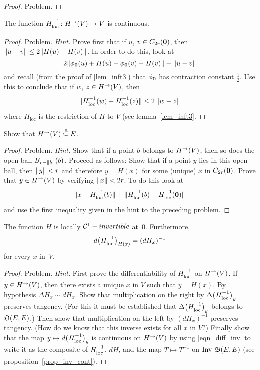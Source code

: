 \begin{proof} Problem.  \ns  \end{proof}

\begin{lem}\label{lem_inft5} The function $H_{\mathstrut\text{loc}}^{\mathstrut{-1}} \colon H^{\rightarrow}(V) \rightarrow V$ is continuous.
\end{lem}

\begin{proof} Problem.  \emph{Hint.}  Prove first that if $u$, $v \in C_{2r}(\mathbf{0})$, then
$\lVert u - v\rVert \le 2\lVert H(u) - H(v)\rVert$.  In order to do this, look at
  \[ 2\lVert\phi_{\mathbf{0}}(u) + H(u) - \phi_{\mathbf{0}}(v) - H(v)\rVert - \lVert u - v\rVert \]
and recall (from the proof of \ref{lem_inft3}) that $\phi_{\mathbf{0}}$ has contraction constant
$\frac12$.  Use this to conclude that if $w$, $z \in H^{\rightarrow}(V)$,  then
  \[ \lVert H_{\mathstrut\text{loc}}^{\mathstrut{-1}}(w) - H_{\mathstrut\text{loc}}^{\mathstrut{-1}}(z)\rVert \le 2\,\lVert w - z\rVert \]
where $H_{\text{loc}}$ is the restriction of $H$ to $V$ (see lemma~\ref{lem_inft3}.  \ns
\end{proof}

\begin{lem}\label{lem_inft6} Show that $H^{\rightarrow}(V)\overset{\thickspace{}_\circ}{\subseteq}E$.
\end{lem}

\begin{proof} Problem.  \emph{Hint.}  Show that if a point $b$ belongs to $H^{\rightarrow}(V)$, then
so does the open ball $B_{r - \lVert b\rVert}(b)$.  Proceed as follows: Show that if a point $y$ lies
in this open ball, then $\lVert y\rVert < r$ and therefore $y = H(x)$ for some (unique) $x$ in
$C_{2r}(\mathbf{0})$.  Prove that $y \in H^{\rightarrow}(V)$ by verifying $\lVert x\rVert < 2r$.  To do this look
at
  \[ \lVert x - H_{\mathstrut\text{loc}}^{\mathstrut{-1}}(b)\rVert + \lVert H_{\mathstrut\text{loc}}^{\mathstrut{-1}}(b) - H_{\mathstrut\text{loc}}^{\mathstrut{-1}}(\mathbf{0})\rVert \]
and use the first inequality given in the hint to the preceding problem.    \ns
\end{proof}

\begin{lem}\label{lem_inft7}  The function $H$ is locally $\mathcal{C}^1-invertible$ at~$0$.  Furthermore,
  \[ d\bigl(H_{\mathstrut\text{loc}}^{\mathstrut{-1}}\bigr)_{H(x)} = (dH_x)^{-1} \]
for every $x$ in~$V$.
\end{lem}

\begin{proof} Problem.   \emph{Hint.}  First prove the differentiability of $H_{\mathstrut\text{loc}}^{\mathstrut{-1}}$ on
$H^{\rightarrow}(V)$.  If $y \in H^{\rightarrow}(V)$, then there exists a unique $x$ in $V$ such that $y =
H(x)$.  By hypothesis $\Delta H_x \sim dH_x$. Show that multiplication on the right by $\Delta
\bigl(H_{\mathstrut\text{loc}}^{\mathstrut{-1}}\bigr)_y$ preserves tangency.  (For this it must be established that $\Delta
\bigl(H_{\mathstrut\text{loc}}^{\mathstrut{-1}}\bigr)_y$ belongs to $\mathfrak{O}(E,E)$.) Then show that multiplication on the left
by $(dH_x)^{-1}$ preserves tangency. (How do we know that this inverse exists for all $x$ in
$V$?) Finally show that the map $y \mapsto d\bigl(H_{\mathstrut\text{loc}}^{\mathstrut{-1}}\bigr)_y$ is continuous on
$H^{\rightarrow}(V)$ by using \eqref{eqn_diff_inv} to write it as the composite of $H_{\mathstrut\text{loc}}^{\mathstrut{-1}}$, $dH$,
and the map $T \mapsto T^{-1}$ on $\operatorname{Inv}\,\mathfrak{B}(E,E)$ (see proposition~\ref{prop_inv_cont}).
\ns \end{proof}

